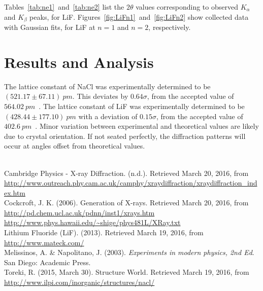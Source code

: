 \documentclass[aps,prl,twocolumn,superscriptaddress]{revtex4-1}
\begin{document}
Tables~\ref{tab:ne1}~and~\ref{tab:ne2} list the $2\theta$ values corresponding to observed $K_{\alpha}$ and $K_{\beta}$ peaks, for LiF.  Figures~\ref{fig:LiFn1}~and~\ref{fig:LiFn2} show collected data with Gaussian fits, for LiF at $n=1$ and $n=2$, respectively.




\section{Results and Analysis}

The lattice constant of NaCl was experimentally determined to be $(521.17\pm67.11)~pm$. This deviates by $0.64\sigma$, from the accepted value of $564.02~pm$~\cite{anacl}.  The lattice constant of LiF was experimentally determined to be $(428.44\pm177.10)~pm$ with a deviation of $0.15\sigma$, from the accepted value of $402.6~pm$~\cite{alif}.  Minor variation between experimental and theoretical values are likely due to crystal orientation.  If not seated perfectly, the diffraction patterns will occur at angles offset from theoretical values.





\setlength{\parindent}{0cm}
%

%

%




\begin{thebibliography}{99}
~\\ %

 Cambridge Physics - X-ray Diffraction. (n.d.). Retrieved March 20, 2016, from \url{http://www.outreach.phy.cam.ac.uk/camphy/xraydiffraction/xraydiffraction_index.htm} \\

 Cockcroft, J. K. (2006). Generation of X-rays. Retrieved March 20, 2016, from \url{http://pd.chem.ucl.ac.uk/pdnn/inst1/xrays.htm} \\

 \url{http://www.phys.hawaii.edu/~shige/phys481L/XRay.txt} \\

 Lithium Fluoride (LiF). (2013). Retrieved March 19, 2016, from \url{http://www.mateck.com/} \\

 Melissinos, A. \& Napolitano, J. (2003). \textit{Experiments in modern physics, 2nd Ed}. San Diego: Academic Press. \\

 Toreki, R. (2015, March 30). Structure World. Retrieved March 19, 2016, from \url{http://www.ilpi.com/inorganic/structures/nacl/} \\

\end{thebibliography}
\end{document}
